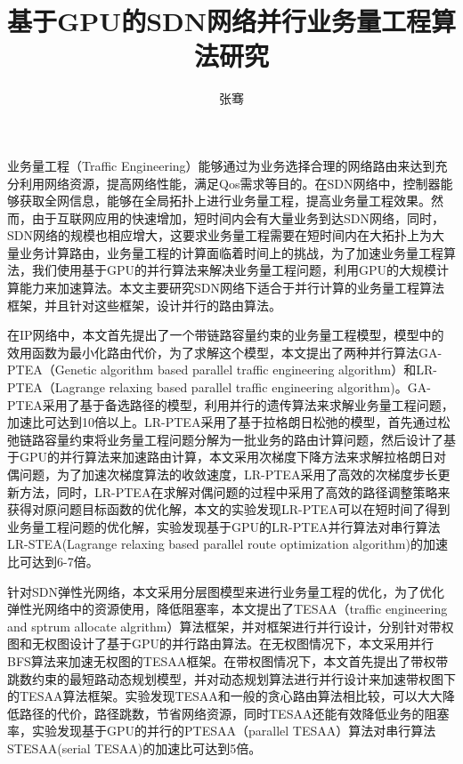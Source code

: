 \documentclass[master]{thesis-uestc}
\title{基于GPU的SDN网络并行业务量工程算法研究}
\author{张骞}
\begin{document}
\begin{chineseabstract}
业务量工程（Traffic Engineering）能够通过为业务选择合理的网络路由来达到充分利用网络资源，提高网络性能，满足Qos需求等目的。在SDN网络中，控制器能够获取全网信息，能够在全局拓扑上进行业务量工程，提高业务量工程效果。然而，由于互联网应用的快速增加，短时间内会有大量业务到达SDN网络，同时，SDN网络的规模也相应增大，这要求业务量工程需要在短时间内在大拓扑上为大量业务计算路由，业务量工程的计算面临着时间上的挑战，为了加速业务量工程算法，我们使用基于GPU的并行算法来解决业务量工程问题，利用GPU的大规模计算能力来加速算法。本文主要研究SDN网络下适合于并行计算的业务量工程算法框架，并且针对这些框架，设计并行的路由算法。

在IP网络中，本文首先提出了一个带链路容量约束的业务量工程模型，模型中的效用函数为最小化路由代价，为了求解这个模型，本文提出了两种并行算法GA-PTEA（Genetic algorithm based parallel traffic engineering algorithm）和LR-PTEA（Lagrange relaxing based parallel traffic engineering algorithm)。GA-PTEA采用了基于备选路径的模型，利用并行的遗传算法来求解业务量工程问题，加速比可达到10倍以上。LR-PTEA采用了基于拉格朗日松弛的模型，首先通过松弛链路容量约束将业务量工程问题分解为一批业务的路由计算问题，然后设计了基于GPU的并行算法来加速路由计算，本文采用次梯度下降方法来求解拉格朗日对偶问题，为了加速次梯度算法的收敛速度，LR-PTEA采用了高效的次梯度步长更新方法，同时，LR-PTEA在求解对偶问题的过程中采用了高效的路径调整策略来获得对原问题目标函数的优化解，本文的实验发现LR-PTEA可以在短时间了得到业务量工程问题的优化解，实验发现基于GPU的LR-PTEA并行算法对串行算法LR-STEA(Lagrange relaxing based parallel route optimization algorithm)的加速比可达到6-7倍。

针对SDN弹性光网络，本文采用分层图模型来进行业务量工程的优化，为了优化弹性光网络中的资源使用，降低阻塞率，本文提出了TESAA（traffic engineering and sptrum allocate algrithm）算法框架，并对框架进行并行设计，分别针对带权图和无权图设计了基于GPU的并行路由算法。在无权图情况下，本文采用并行BFS算法来加速无权图的TESAA框架。在带权图情况下，本文首先提出了带权带跳数约束的最短路动态规划模型，并对动态规划算法进行并行设计来加速带权图下的TESAA算法框架。实验发现TESAA和一般的贪心路由算法相比较，可以大大降低路径的代价，路径跳数，节省网络资源，同时TESAA还能有效降低业务的阻塞率，实验发现基于GPU的并行的PTESAA（parallel TESAA）算法对串行算法STESAA(serial TESAA)的加速比可达到5倍。

\end{chineseabstract}
\end{document}
